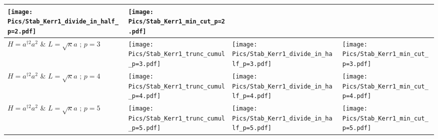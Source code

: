 \begin{landscape}
\begin{longtable}{|p{3cm}|p{7.2cm}|p{7.2cm}|p{7.2cm}|}
\begin{minipage}{7cm}
            \centering
            \texttt{[image: Pics/Stab\_Kerr1\_divide\_in\_half\_p=2.pdf]}
        \end{minipage}&
    \begin{minipage}{7cm}
        \centering
        \texttt{[image: Pics/Stab\_Kerr1\_min\_cut\_p=2.pdf]}
    \end{minipage}\\
    \hline    
    $H=a^{\dagger 2}a^2$ \& $L = \sqrt{\kappa} a$ ; $p=3$ &
    \begin{minipage}{7cm}
        \centering
        \texttt{[image: Pics/Stab\_Kerr1\_trunc\_cumul\_p=3.pdf]}
    \end{minipage}&
    \begin{minipage}{7cm}
            \centering
            \texttt{[image: Pics/Stab\_Kerr1\_divide\_in\_half\_p=3.pdf]}
        \end{minipage}&
    \begin{minipage}{7cm}
        \centering
        \texttt{[image: Pics/Stab\_Kerr1\_min\_cut\_p=3.pdf]}
    \end{minipage}\\
    \hline   
    $H=a^{\dagger 2}a^2$ \& $L = \sqrt{\kappa} a$ ; $p=4$ &
    \begin{minipage}{7cm}
        \centering
        \texttt{[image: Pics/Stab\_Kerr1\_trunc\_cumul\_p=4.pdf]}
    \end{minipage}&
    \begin{minipage}{7cm}
            \centering
            \texttt{[image: Pics/Stab\_Kerr1\_divide\_in\_half\_p=4.pdf]}
        \end{minipage}&
    \begin{minipage}{7cm}
        \centering
        \texttt{[image: Pics/Stab\_Kerr1\_min\_cut\_p=4.pdf]}
    \end{minipage}\\
    \hline   
    $H=a^{\dagger 2}a^2$ \& $L = \sqrt{\kappa} a$ ; $p=5$ &
    \begin{minipage}{7cm}
        \centering
        \texttt{[image: Pics/Stab\_Kerr1\_trunc\_cumul\_p=5.pdf]}
    \end{minipage}&
    \begin{minipage}{7cm}
            \centering
            \texttt{[image: Pics/Stab\_Kerr1\_divide\_in\_half\_p=5.pdf]}
        \end{minipage}&
    \begin{minipage}{7cm}
        \centering
        \texttt{[image: Pics/Stab\_Kerr1\_min\_cut\_p=5.pdf]}
    \end{minipage}\\

\end{longtable}
\end{landscape}
